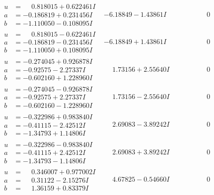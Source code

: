 \documentclass[1p]{elsarticle_modified}
\theoremstyle{definition}
\begin{document}
$$\begin{array}{c|c|c}
\begin{aligned}
u &= \phantom{-}0.818015 + 0.622461 I \\
a &= -0.186819 + 0.231456 I \\
b &= -1.110050 - 0.108095 I\end{aligned}
 & -6.18849 - 1.43861 I & \phantom{-0.000000 } 0 \\ \hline\begin{aligned}
u &= \phantom{-}0.818015 - 0.622461 I \\
a &= -0.186819 - 0.231456 I \\
b &= -1.110050 + 0.108095 I\end{aligned}
 & -6.18849 + 1.43861 I & \phantom{-0.000000 } 0 \\ \hline\begin{aligned}
u &= -0.274045 + 0.926878 I \\
a &= -0.92575 - 2.27337 I \\
b &= -0.602160 + 1.228960 I\end{aligned}
 & \phantom{-}1.73156 + 2.55640 I & \phantom{-0.000000 } 0 \\ \hline\begin{aligned}
u &= -0.274045 - 0.926878 I \\
a &= -0.92575 + 2.27337 I \\
b &= -0.602160 - 1.228960 I\end{aligned}
 & \phantom{-}1.73156 - 2.55640 I & \phantom{-0.000000 } 0 \\ \hline\begin{aligned}
u &= -0.322986 + 0.983840 I \\
a &= -0.41115 - 2.42512 I \\
b &= -1.34793 + 1.14806 I\end{aligned}
 & \phantom{-}2.69083 - 3.89242 I & \phantom{-0.000000 } 0 \\ \hline\begin{aligned}
u &= -0.322986 - 0.983840 I \\
a &= -0.41115 + 2.42512 I \\
b &= -1.34793 - 1.14806 I\end{aligned}
 & \phantom{-}2.69083 + 3.89242 I & \phantom{-0.000000 } 0 \\ \hline\begin{aligned}
u &= \phantom{-}0.346007 + 0.977002 I \\
a &= \phantom{-}0.31122 - 2.15276 I \\
b &= \phantom{-}1.36159 + 0.83379 I\end{aligned}
 & \phantom{-}4.67825 - 0.54660 I & \phantom{-0.000000 } 0 \\ \hline\begin{aligned}

\end{aligned}
\end{array}$$
\end{document}
